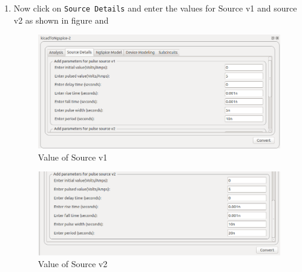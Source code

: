\begin{enumerate}
\item Now click on \texttt{Source Details} and enter the values for Source v1 and source v2 as shown in figure  and 
\begin{figure}[!htp]
                \centering
                \includegraphics[width =\hgfig]{./NGHDL/val1.png}
                \caption{Value of Source v1}
                \label{val1}
            \end{figure}
           \begin{figure}[!htp]
            \centering
            \includegraphics[width =\hgfig]{./NGHDL/val2.png}
            \caption{Value of Source v2}
            \label{val2}
        \end{figure}


\end{enumerate}
